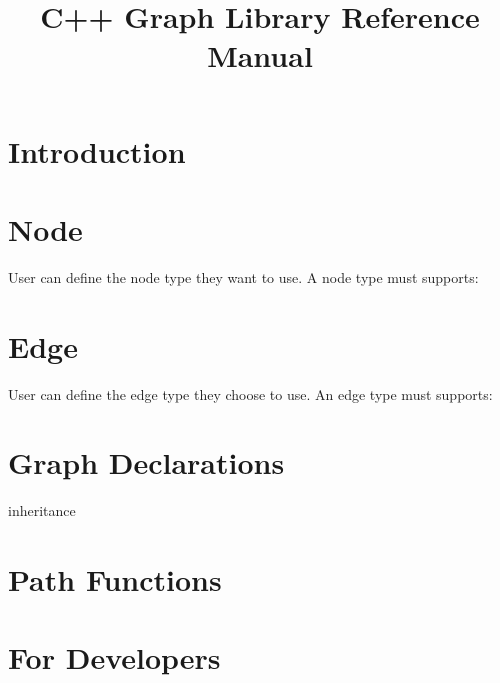 \documentclass[]{article}
\title{C++ Graph Library Reference Manual}
\author{}
\begin{document}
\maketitle
\section{Introduction}

\section {Node}
User can define the node type they want to use. A node type must supports:

\section {Edge}
User can define the edge type they choose to use. An edge type must supports:

\section{Graph Declarations}
inheritance
\subsection{}
\section{Path Functions}
\section{For Developers}
\end{document}
